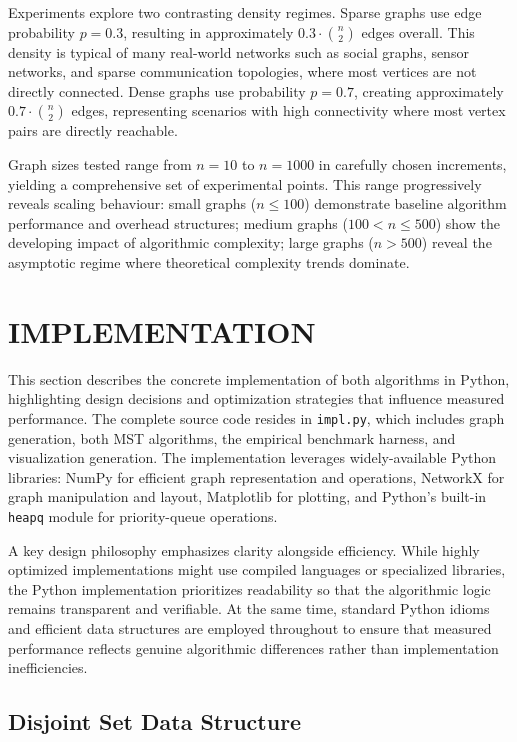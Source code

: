 ﻿\documentclass[12pt]{article}
\begin{document}
Experiments explore two contrasting density regimes. Sparse graphs use edge probability $p=0.3$, resulting in approximately $0.3 \cdot \binom{n}{2}$ edges overall. This density is typical of many real-world networks such as social graphs, sensor networks, and sparse communication topologies, where most vertices are not directly connected. Dense graphs use probability $p=0.7$, creating approximately $0.7 \cdot \binom{n}{2}$ edges, representing scenarios with high connectivity where most vertex pairs are directly reachable.

Graph sizes tested range from $n=10$ to $n=1000$ in carefully chosen increments, yielding a comprehensive set of experimental points. This range progressively reveals scaling behaviour: small graphs ($n \leq 100$) demonstrate baseline algorithm performance and overhead structures; medium graphs ($100 < n \leq 500$) show the developing impact of algorithmic complexity; large graphs ($n > 500$) reveal the asymptotic regime where theoretical complexity trends dominate.

\newpage
{}
\section{IMPLEMENTATION}

This section describes the concrete implementation of both algorithms in Python, highlighting design decisions and optimization strategies that influence measured performance. The complete source code resides in \texttt{impl.py}, which includes graph generation, both MST algorithms, the empirical benchmark harness, and visualization generation. The implementation leverages widely-available Python libraries: NumPy for efficient graph representation and operations, NetworkX for graph manipulation and layout, Matplotlib for plotting, and Python's built-in \texttt{heapq} module for priority-queue operations.

A key design philosophy emphasizes clarity alongside efficiency. While highly optimized implementations might use compiled languages or specialized libraries, the Python implementation prioritizes readability so that the algorithmic logic remains transparent and verifiable. At the same time, standard Python idioms and efficient data structures are employed throughout to ensure that measured performance reflects genuine algorithmic differences rather than implementation inefficiencies.

\subsection{Disjoint Set Data Structure}
\end{document}
